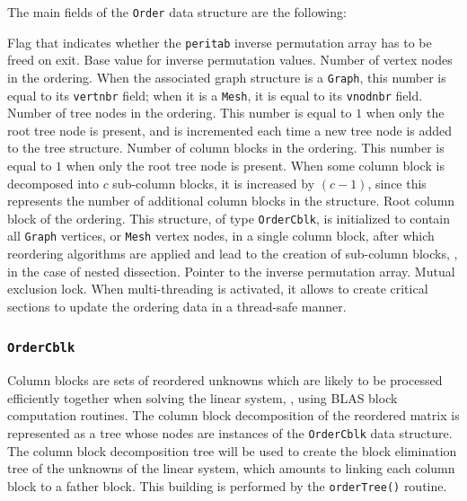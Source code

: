 The main fields of the \texttt{Order} data structure are the
following:
\begin{itemize}
Flag that indicates whether the \texttt{peritab} inverse permutation
array has to be freed on exit.
Base value for inverse permutation values.
Number of vertex nodes in the ordering. When the associated graph
structure is a \texttt{Graph}, this number is equal to its
\texttt{vertnbr} field; when it is a \texttt{Mesh}, it is equal to
its \texttt{vnodnbr} field.
Number of tree nodes in the ordering. This number is equal to $1$ when
only the root tree node is present, and is incremented each time a new
tree node is added to the tree structure.
Number of column blocks in the ordering. This number is equal to $1$
when only the root tree node is present. When some column block
is decomposed into $c$ sub-column blocks, it is increased by $(c-1)$,
since this represents the number of additional column blocks in the
structure.
Root column block of the ordering. This structure, of type
\texttt{Order\lbt Cblk}, is initialized to contain all \texttt{Graph}
vertices, or \texttt{Mesh} vertex nodes, in a single column block,
after which reordering algorithms are applied and lead to the creation
of sub-column blocks, \eg, in the case of nested dissection.
Pointer to the inverse permutation array.
Mutual exclusion lock. When multi-threading is activated, it allows to
create critical sections to update the ordering data in a thread-safe
manner.
\end{itemize}

\subsubsection{\texttt{OrderCblk}}
\label{sec-data-order-cblk}

Column blocks are sets of reordered unknowns which are likely to be
processed efficiently together when solving the linear system, \eg,
using BLAS block computation routines. The column block decomposition
of the reordered matrix is represented as a tree whose nodes are
instances of the \texttt{OrderCblk} data structure. The column block
decomposition tree will be used to create the block elimination tree
of the unknowns of the linear system, which amounts to linking each
column block to a father block. This building is performed by the
\texttt{order\lbt Tree()} routine.

